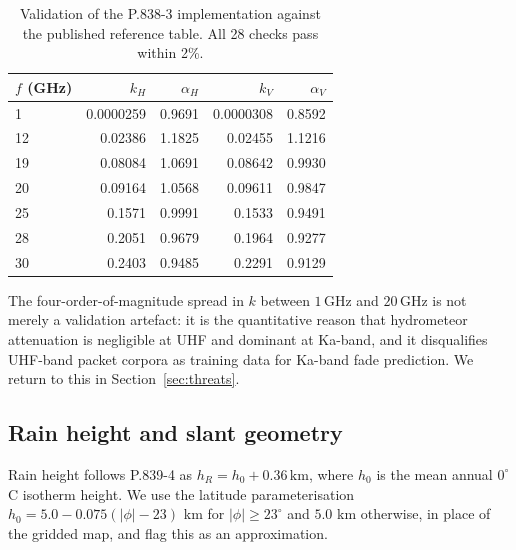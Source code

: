 \documentclass[10pt,twocolumn]{article}
\newcommand{\km}{\,\mathrm{km}}
\newcommand{\GHz}{\,\mathrm{GHz}}
\begin{document}
\begin{table}[t]
\centering
\caption{Validation of the P.838-3 implementation against the published
reference table. All 28 checks pass within 2\%.}
\label{tab:itu}
\small
\begin{tabular}{@{}lrrrr@{}}
\toprule
$f$ (GHz) & $k_{H}$ & $\alpha_{H}$ & $k_{V}$ & $\alpha_{V}$ \\
\midrule
1  & 0.0000259 & 0.9691 & 0.0000308 & 0.8592 \\
12 & 0.02386   & 1.1825 & 0.02455   & 1.1216 \\
19 & 0.08084   & 1.0691 & 0.08642   & 0.9930 \\
20 & 0.09164   & 1.0568 & 0.09611   & 0.9847 \\
25 & 0.1571    & 0.9991 & 0.1533    & 0.9491 \\
28 & 0.2051    & 0.9679 & 0.1964    & 0.9277 \\
30 & 0.2403    & 0.9485 & 0.2291    & 0.9129 \\
\bottomrule
\end{tabular}
\end{table}

The four-order-of-magnitude spread in $k$ between $1\GHz$ and $20\GHz$ is not
merely a validation artefact: it is the quantitative reason that hydrometeor
attenuation is negligible at UHF and dominant at Ka-band, and it disqualifies
UHF-band packet corpora as training data for Ka-band fade prediction. We return
to this in Section~\ref{sec:threats}.

\subsection{Rain height and slant geometry}

Rain height follows P.839-4 as $h_{R}=h_{0}+0.36\km$, where $h_{0}$ is the mean
annual $0^{\circ}$C isotherm height. We use the latitude parameterisation
$h_{0}=5.0-0.075(|\phi|-23)$ km for $|\phi|\ge 23^{\circ}$ and $5.0$ km
otherwise, in place of the gridded map, and flag this as an approximation.
\end{document}
